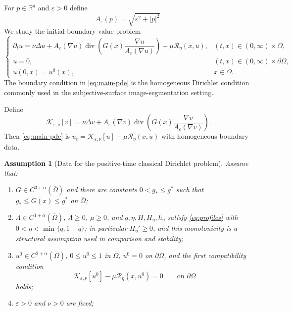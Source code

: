 \documentclass[11pt]{article}
\newtheorem{assumption}[theorem]{Assumption}
\theoremstyle{remark}
\newcommand{\R}{\mathbb{R}}
\newcommand{\eps}{\varepsilon}
\newcommand{\nupar}{\nu}
\newcommand{\cK}{\mathcal{K}}
\newcommand{\cT}{\mathcal{R}}
\begin{document}
For $p\in\R^d$ and $\eps>0$ define
\[
        A_\eps(p)=\sqrt{\eps^2+|p|^2}.
\]
We study the initial-boundary value problem
\begin{equation}\label{eq:main-pde}
\boxed{
\begin{cases}
\partial_t u
=\nupar\Delta u+
A_\eps(\nabla u)\operatorname{div}\!\left(G(x)\dfrac{\nabla u}{A_\eps(\nabla u)}\right)
-\mu\cT_\eta(x,u),
& (t,x)\in(0,\infty)\times\Omega,\\[2mm]
u=0,& (t,x)\in(0,\infty)\times\partial\Omega,\\[1mm]
u(0,x)=u^0(x),& x\in\Omega.
\end{cases}}
\end{equation}
The boundary condition in \eqref{eq:main-pde} is the homogeneous Dirichlet condition commonly used in the subjective-surface image-segmentation setting.



Define
\begin{equation}\label{eq:operator}
\cK_{\eps,\nupar}[v]
=\nupar\Delta v+
A_\eps(\nabla v)\operatorname{div}\!\left(G(x)\frac{\nabla v}{A_\eps(\nabla v)}\right).
\end{equation}
Then \eqref{eq:main-pde} is $u_t=\cK_{\eps,\nupar}[u]-\mu\cT_\eta(x,u)$ with homogeneous boundary data.

\begin{assumption}[Data for the positive-time classical Dirichlet problem]\label{ass:data}
Assume that:
\begin{enumerate}[label=\textup{(A\arabic*)},leftmargin=2.5em]
\item $G\in C^{3+\alpha}(\overline\Omega)$ and there are constants $0<g_*\le g^*$ such that $g_*\le G(x)\le g^*$ on $\overline\Omega$;
\item $\Lambda\in C^{1+\alpha}(\overline\Omega)$, $\Lambda\ge0$, $\mu\ge0$, and $q,\eta,H,H_\eta,h_\eta$ satisfy \eqref{eq:profiles} with $0<\eta<\min\{q,1-q\}$; in particular $H_\eta'\ge0$, and this monotonicity is a structural assumption used in comparison and stability;
\item $u^0\in C^{2+\alpha}(\overline\Omega)$, $0\le u^0\le1$ in $\overline\Omega$, $u^0=0$ on $\partial\Omega$, and the first compatibility condition
\[
        \cK_{\eps,\nupar}[u^0]-\mu\cT_\eta(x,u^0)=0
        \qquad\text{on }\partial\Omega
\]
holds;
\item $\eps>0$ and $\nupar>0$ are fixed;
\end{enumerate}
\end{assumption}
\end{document}
